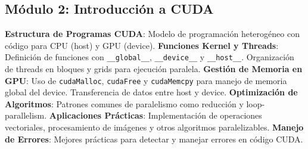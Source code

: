\subsection{Módulo 2: Introducción a CUDA}

\textbf{Estructura de Programas CUDA}: Modelo de programación heterogéneo con código para CPU (host) y GPU (device).
\textbf{Funciones Kernel y Threads}: Definición de funciones con \texttt{\_\_global\_\_}, \texttt{\_\_device\_\_} y
\texttt{\_\_host\_\_}. Organización de threads en bloques y grids para ejecución paralela. \textbf{Gestión de Memoria en
GPU}: Uso de \texttt{cudaMalloc}, \texttt{cudaFree} y \texttt{cudaMemcpy} para manejo de memoria global del device.
Transferencia de datos entre host y device. \textbf{Optimización de Algoritmos}: Patrones comunes de paralelismo como
reducción y loop-parallelism. \textbf{Aplicaciones Prácticas}: Implementación de operaciones vectoriales, procesamiento
de imágenes y otros algoritmos paralelizables. \textbf{Manejo de Errores}: Mejores prácticas para detectar y manejar
errores en código CUDA.


